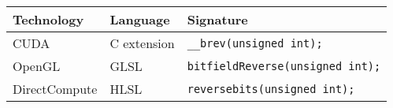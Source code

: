 \begin{tabular}{|l|l|l|}
	\hline
	Technology & Language & Signature \\ \hline
	CUDA & C extension & \texttt{\_\_brev(unsigned int);} \\
	OpenGL & GLSL & \texttt{bitfieldReverse(unsigned int);} \\
	DirectCompute & HLSL & \texttt{reversebits(unsigned int);} \\ \hline
\end{tabular}